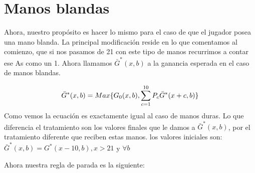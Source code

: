 \documentclass[12pt,a4paper,]{book}
\numberwithin{dummy}{section}
\theoremstyle{ocrenumbox}
\theoremstyle{blacknumex}
\theoremstyle{blacknumbox}
\theoremstyle{ocrenum}
\theoremstyle{ocrenum}
\begin{document}
\hypertarget{Seccion42}{%
\section{Manos blandas}\label{Seccion42}}

Ahora, nuestro propósito es hacer lo mismo para el caso de que el
jugador posea una mano blanda. La principal modificación reside en lo
que comentamos al comienzo, que si nos pasamos de 21 con este tipo de
manos recurrimos a contar ese As como un 1. Ahora llamamos
\(\bar G^*(x,b)\) a la ganancia esperada en el caso de manos blandas.

\[
\bar G^*(x,b) = Max \\ \{G_0(x,b), \sum_{c=1}^{10}P_c \bar G^*(x+c,b) \}
\] Como vemos la ecuación es exactamente igual al caso de manos duras.
Lo que diferencia el tratamiento son los valores finales que le damos a
\(\bar G^*(x,b)\), por el tratamiento diferente que reciben estas manos.
los valores iniciales son: \(\bar G^*(x,b) = G^*(x-10,b),x>21\) y
\(\forall b\)

Ahora nuestra regla de parada es la siguiente:

\begingroup\fontsize{12}{14}\selectfont
\end{document}
